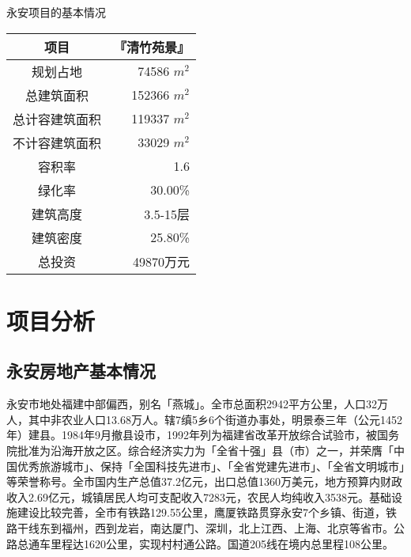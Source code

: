   \begin{center}
  \renewcommand*{\arraystretch}{0.6}
  \setlength{\tabcolsep}{12pt}
  \begin{threeparttable}\vspace{-1.0cm}
 \caption{永安项目的基本情况}
 \renewcommand{\arraystretch}{1.1} \arrayrulewidth=0.8pt \tabcolsep=10pt
 	 \begin{tabular}{>{\footnotesize}c>{\footnotesize}r}
	\hline\hline
\rowcolor{mycyan}	\bfseries 项目 	& \bfseries 『清竹苑景』\\
	\hline \renewcommand{\arraystretch}{.8}
规划占地	&	74586 $m^2$	\\
总建筑面积	&	152366 $m^2$	\\
总计容建筑面积	&	119337 $m^2$\\
不计容建筑面积	&	33029 $m^2$	\\
容积率	&	1.6	\\
绿化率	&	30.00\%	\\
建筑高度	&	3.5-15层	\\
建筑密度	&	25.80\%	\\
\midrule
总投资	&	49870万元	\\
	\bottomrule
	\end{tabular}
\end{threeparttable}
\end{center}

\section{项目分析}
\subsection{永安房地产基本情况}
永安市地处福建中部偏西，别名「燕城」。全市总面积2942平方公里，人口32万人，其中非农业人口13.68万人。辖7缜5乡6个街道办事处，明景泰三年（公元1452年）建县。1984年9月撤县设市，1992年列为福建省改革开放综合试验市，被国务院批准为沿海开放之区。综合经济实力为「全省十强」县（市）之一，并荣膺「中国优秀旅游城市」、保持「全国科技先进市」、「全省党建先进市」、「全省文明城市」等荣誉称号。全市国内生产总值37.2亿元，出口总值1360万美元，地方预算内财政收入2.69亿元，城镇居民人均可支配收入7283元，农民人均纯收入3538元。基础设施建设比较完善，全市有铁路129.55公里，鹰厦铁路贯穿永安7个乡镇、街道，铁路干线东到福州，西到龙岩，南达厦门、深圳，北上江西、上海、北京等省市。公路总通车里程达1620公里，实现村村通公路。国道205线在境内总里程108公里。

